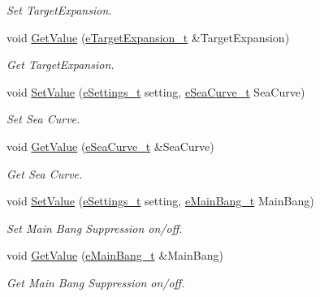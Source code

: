 \begin{DoxyCompactItemize}
\begin{DoxyCompactList}\small\item\em Set Target\+Expansion. \end{DoxyCompactList}\item 
void \mbox{\hyperlink{struct_quantum_lib_1_1_setting_data__t_a399846c9c536a1573ab9a4c6f7781d5f}{Get\+Value}} (\mbox{\hyperlink{namespace_quantum_lib_affbc8bc0775b14917688e0e6d2fab0fb}{e\+Target\+Expansion\+\_\+t}} \&Target\+Expansion)
\begin{DoxyCompactList}\small\item\em Get Target\+Expansion. \end{DoxyCompactList}\item 
void \mbox{\hyperlink{struct_quantum_lib_1_1_setting_data__t_acd333656320fa69fa9370015855825e2}{Set\+Value}} (\mbox{\hyperlink{namespace_quantum_lib_acc8124e3e65bca4aa798d03a55e3d54c}{e\+Settings\+\_\+t}} setting, \mbox{\hyperlink{namespace_quantum_lib_aeaeea421c9323b85e6b45fa78e3b2a06}{e\+Sea\+Curve\+\_\+t}} Sea\+Curve)
\begin{DoxyCompactList}\small\item\em Set Sea Curve. \end{DoxyCompactList}\item 
void \mbox{\hyperlink{struct_quantum_lib_1_1_setting_data__t_a4024e847bab2f1d9d418dc562231bae2}{Get\+Value}} (\mbox{\hyperlink{namespace_quantum_lib_aeaeea421c9323b85e6b45fa78e3b2a06}{e\+Sea\+Curve\+\_\+t}} \&Sea\+Curve)
\begin{DoxyCompactList}\small\item\em Get Sea Curve. \end{DoxyCompactList}\item 
void \mbox{\hyperlink{struct_quantum_lib_1_1_setting_data__t_a6942f85824f41fa3a45b6989e2cb7e4e}{Set\+Value}} (\mbox{\hyperlink{namespace_quantum_lib_acc8124e3e65bca4aa798d03a55e3d54c}{e\+Settings\+\_\+t}} setting, \mbox{\hyperlink{namespace_quantum_lib_af78fc1282ff8d85de46fff58a89f5798}{e\+Main\+Bang\+\_\+t}} Main\+Bang)
\begin{DoxyCompactList}\small\item\em Set Main Bang Suppression on/off. \end{DoxyCompactList}\item 
void \mbox{\hyperlink{struct_quantum_lib_1_1_setting_data__t_a37296c7511b7739913035eb2920f6f4b}{Get\+Value}} (\mbox{\hyperlink{namespace_quantum_lib_af78fc1282ff8d85de46fff58a89f5798}{e\+Main\+Bang\+\_\+t}} \&Main\+Bang)
\begin{DoxyCompactList}\small\item\em Get Main Bang Suppression on/off. \end{DoxyCompactList}\item 

\end{DoxyCompactItemize}
